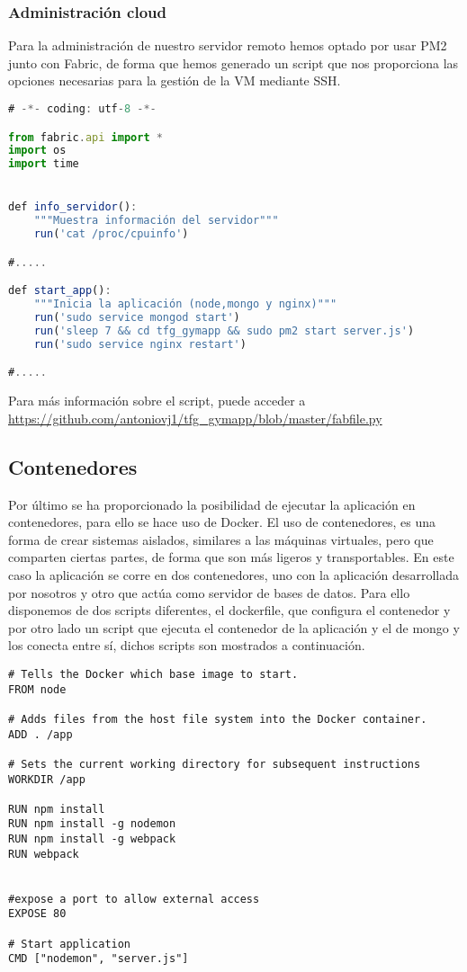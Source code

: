 \subsubsection {Administración cloud}
Para la administración de nuestro servidor remoto hemos optado por usar PM2 junto con Fabric, de forma que hemos generado un script que nos proporciona las opciones necesarias para la gestión de la VM mediante SSH.

\begin{lstlisting}[language=javascript,caption={Test Unitarios},label={lst:appjs}]
# -*- coding: utf-8 -*-

from fabric.api import *
import os
import time


def info_servidor():
    """Muestra información del servidor"""
    run('cat /proc/cpuinfo')

#.....

def start_app():
    """Inicia la aplicación (node,mongo y nginx)"""
    run('sudo service mongod start')
    run('sleep 7 && cd tfg_gymapp && sudo pm2 start server.js')
    run('sudo service nginx restart')

#.....    

\end{lstlisting}

Para más información sobre el script, puede acceder a \url{https://github.com/antoniovj1/tfg_gymapp/blob/master/fabfile.py}

\subsection {Contenedores}
Por último se ha proporcionado la posibilidad de ejecutar la aplicación en contenedores, para ello se hace uso de Docker. El uso de contenedores, es una forma de crear sistemas aislados, similares a las máquinas virtuales, pero que comparten ciertas partes, de forma que son más ligeros y transportables. En este caso la aplicación se corre en dos contenedores, uno con la aplicación desarrollada por nosotros y otro que actúa como servidor de bases de datos. Para ello disponemos de dos scripts diferentes, el dockerfile, que configura el contenedor y por otro lado un script que ejecuta el contenedor de la aplicación y el de mongo y los conecta entre sí, dichos scripts son mostrados a continuación.

\begin{lstlisting}
# Tells the Docker which base image to start.
FROM node

# Adds files from the host file system into the Docker container.  
ADD . /app

# Sets the current working directory for subsequent instructions
WORKDIR /app

RUN npm install
RUN npm install -g nodemon
RUN npm install -g webpack
RUN webpack


#expose a port to allow external access
EXPOSE 80

# Start application
CMD ["nodemon", "server.js"] 
\end{lstlisting}

